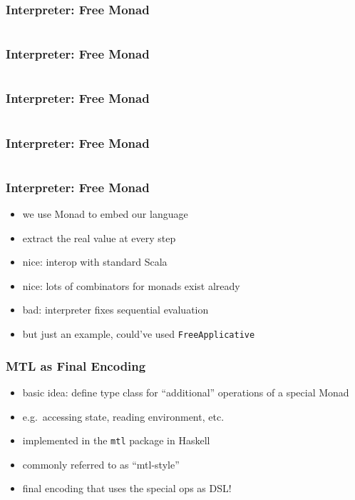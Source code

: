 \documentclass[aspectratio=169, hyperref={colorlinks, linkcolor=beamer@centricgreen}, urlcolor=links]{beamer}
\begin{document}
\begin{frame}
  \frametitle{Interpreter: Free Monad}
  \inputminted[fontsize=\footnotesize]{scala}{snippets/initial-free-expr.scala}
\end{frame}

\begin{frame}
  \frametitle{Interpreter: Free Monad}
  \inputminted[fontsize=\footnotesize]{scala}{snippets/initial-free-ctors.scala}
\end{frame}

\begin{frame}
  \frametitle{Interpreter: Free Monad}
  \inputminted[fontsize=\footnotesize]{scala}{snippets/initial-free-sample.scala}
\end{frame}

\begin{frame}
  \frametitle{Interpreter: Free Monad}
  \inputminted[fontsize=\footnotesize]{scala}{snippets/initial-free-interp.scala}
\end{frame}

\begin{frame}
  \frametitle{Interpreter: Free Monad}
  \begin{itemize}
  \item we use Monad to embed our language
  \item extract the real value at every step
  \item nice: interop with standard Scala
  \item nice: lots of combinators for monads exist already
  \item bad: interpreter fixes sequential evaluation
  \item but just an example, could've used \texttt{FreeApplicative}
  \end{itemize}
\end{frame}

\begin{frame}
  \frametitle{MTL as Final Encoding}
  \begin{itemize}
  \item basic idea: define type class for ``additional'' operations of a special Monad
  \item e.g.\ accessing state, reading environment, etc.
  \item implemented in the \texttt{mtl} package in Haskell
  \item commonly referred to as ``mtl-style''
  \item final encoding that uses the special ops as DSL!\@
  \end{itemize}
\end{frame}
\end{document}
